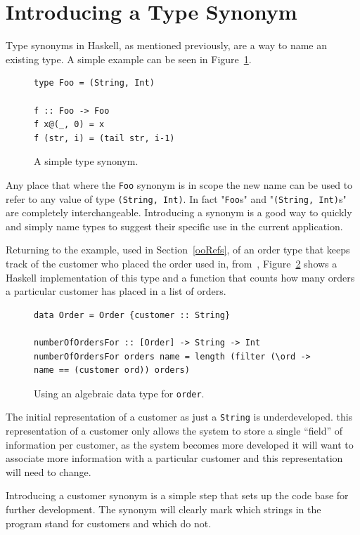 \section{Introducing a Type Synonym}\label{introSyn}

Type synonyms in Haskell, as mentioned previously, are a way to name an existing type. A simple example can be seen in Figure~\ref{fooSyn}. 

\begin{figure}[t]
	\begin{lstlisting}
type Foo = (String, Int)

f :: Foo -> Foo
f x@(_, 0) = x
f (str, i) = (tail str, i-1) 
	\end{lstlisting}
	\caption{A simple type synonym.}\label{fooSyn}
\end{figure}

Any place that where the \texttt{Foo} synonym is in scope the new name can be used to refer to any value of type \texttt{(String, Int)}. In fact "\texttt{Foo}s" and "\texttt{(String, Int)}s" are completely interchangeable. Introducing a synonym is a good way to quickly and simply name types to suggest their specific use in the current application.

Returning to the example, used in Section~\ref{ooRefs}, of an order type that keeps track of the customer who placed the order used in, from~\cite{fowler}, Figure~\ref{haskellOrder} shows a Haskell implementation of this type and a function that counts how many orders a particular customer has placed in a list of orders.

\begin{figure}
	\begin{lstlisting}
data Order = Order {customer :: String}

numberOfOrdersFor :: [Order] -> String -> Int
numberOfOrdersFor orders name = length (filter (\ord -> name == (customer ord)) orders)
	\end{lstlisting}
	\caption{Using an algebraic data type for \texttt{order}.}
	\label{haskellOrder}
\end{figure}

The initial representation of a customer as just a \texttt{String} is underdeveloped. this representation of a customer only allows the system to store a single ``field'' of information per customer, as the system becomes more developed it will want to associate more information with a particular customer and this representation will need to change.

 Introducing a customer synonym is a simple step that sets up the code base for further development. The synonym will clearly mark which strings in the program stand for customers and which do not.

